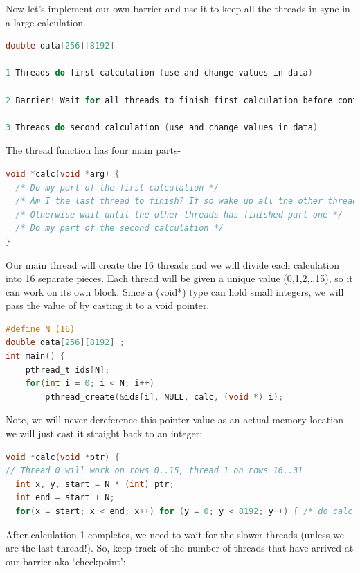 Now let's implement our own barrier and use it to keep all the threads in sync in a large calculation.

\begin{lstlisting}[language=C]
double data[256][8192]

1 Threads do first calculation (use and change values in data)

2 Barrier! Wait for all threads to finish first calculation before continuing

3 Threads do second calculation (use and change values in data)
\end{lstlisting}

The thread function has four main parts-

\begin{lstlisting}[language=C]
void *calc(void *arg) {
  /* Do my part of the first calculation */
  /* Am I the last thread to finish? If so wake up all the other threads! */
  /* Otherwise wait until the other threads has finished part one */
  /* Do my part of the second calculation */
}
\end{lstlisting}

Our main thread will create the 16 threads and we will divide each calculation into 16 separate pieces. Each thread will be given a unique value (0,1,2,..15), so it can work on its own block. Since a (void*) type can hold small integers, we will pass the value of  by casting it to a void pointer.

\begin{lstlisting}[language=C]
#define N (16)
double data[256][8192] ;
int main() {
    pthread_t ids[N];
    for(int i = 0; i < N; i++)  
        pthread_create(&ids[i], NULL, calc, (void *) i);
\end{lstlisting}

Note, we will never dereference this pointer value as an actual memory location - we will just cast it straight back to an integer:

\begin{lstlisting}[language=C]
void *calc(void *ptr) {
// Thread 0 will work on rows 0..15, thread 1 on rows 16..31
  int x, y, start = N * (int) ptr;
  int end = start + N; 
  for(x = start; x < end; x++) for (y = 0; y < 8192; y++) { /* do calc #1 */ }
\end{lstlisting}

After calculation 1 completes, we need to wait for the slower threads (unless we are the last thread!). So, keep track of the number of threads that have arrived at our barrier aka `checkpoint':


